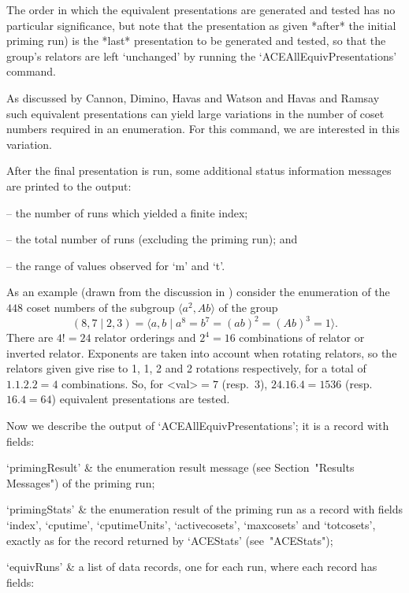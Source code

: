 The order in which the  equivalent  presentations  are  generated  and
tested has no particular significance, but note that the  presentation
as given *after* the initial priming run) is the  *last*  presentation
to be generated and tested, so that  the  group's  relators  are  left
\lq{}unchanged' by running the `ACEAllEquivPresentations' command.

As discussed by Cannon, Dimino, Havas  and  Watson  \cite{CDHW73}  and
Havas and Ramsay \cite{HR99b} such equivalent presentations can  yield
large variations in  the  number  of  coset  numbers  required  in  an
enumeration. For this command, we are interested in this variation.

After  the  final  presentation  is  run,   some   additional   status
information messages are printed to the {\ACE} output:

\beginlist
\item{--}  the number of runs which yielded a finite index; 
\item{--}  the total number of runs (excluding the priming run); and 
\item{--}  the range of values observed for `m' and `t'.
\endlist

As an example (drawn from the discussion in \cite{HR99a}) consider the
enumeration   of   the   $448$   coset   numbers   of   the   subgroup
$\langle  a^2,Ab \rangle$ of the group
$$ (8,7 \mid 2,3) 
    = \langle a,b \mid a^8 = b^7 = (ab)^2 = (Ab)^3 = 1 \rangle. $$
There are $4!=24$  relator  orderings  and  $2^4=16$  combinations  of
relator or inverted relator. Exponents are  taken  into  account  when
rotating relators, so the relators given give rise to 1, 1,  2  and  2
rotations respectively, for a total of $1.1.2.2=4$  combinations.  So,
for  <val>${} = 7$   (resp.~$3$),   $24.16.4=1536$   (resp.~$16.4=64$)
equivalent presentations are tested.

Now we describe the output  of  `ACEAllEquivPresentations';  it  is  a
record with fields:

\beginitems

\quad`primingResult' & the  {\ACE}  enumeration  result  message  (see
Section~"Results Messages") of the priming run;

\quad`primingStats' & the enumeration result of the priming run  as  a
{\GAP}  record  with  fields   `index',   `cputime',   `cputimeUnits',
`activecosets', `maxcosets' and `totcosets', exactly as for the record
returned by `ACEStats' (see~"ACEStats");

\quad`equivRuns' & a list of data records, one  for  each  run,  where
each record has fields:

